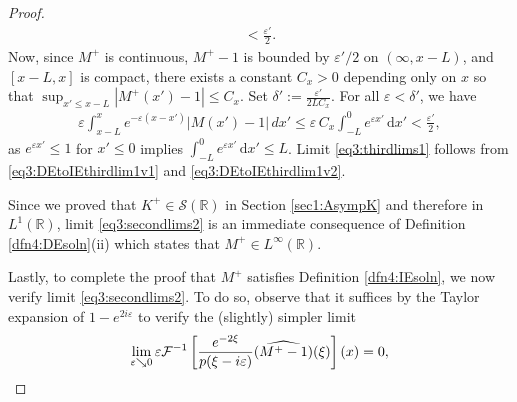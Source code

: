 \documentclass[../dissertation.tex]{subfiles}
\begin{document}
\begin{proof}
\begin{align}
			< \frac{\varepsilon'}{2}.
	\end{align}
	Now, since $M^+$ is continuous, $M^+-1$ is bounded by $\varepsilon'/2$ on $(\infty, x-L)$,
	and $[x-L, x]$ is compact, there exists a constant $C_x > 0$ depending only on $x$
	so that $\sup_{x'\leq x-L}|M^+(x')-1| \leq C_x$. 
	Set $\delta':= \frac{\varepsilon'}{2 L C_x}$.
	For all $\varepsilon < \delta'$, we have
	\begin{align} \label{eq3:DEtoIEthirdlim1v2}
		\varepsilon \int_{x-L}^{x} e^{-\varepsilon(x-x')} |M(x') - 1| \,dx'
			\leq \varepsilon \, C_x \int_{-L}^0 e^{\varepsilon x'} \, \mathrm{d}x'
			< \frac{\varepsilon'}{2},
	\end{align}
	as $e^{\varepsilon x'} \leq 1$ for $x' \leq 0$ implies 
	$\int_{-L}^0 e^{\varepsilon x'} \, \mathrm{d}x'\leq L$. Limit \eqref{eq3:thirdlims1} follows
	from \eqref{eq3:DEtoIEthirdlim1v1} and \eqref{eq3:DEtoIEthirdlim1v2}.

	Since we proved that $K^+\in \mathcal S(\mathbb R)$ in Section \ref{sec1:AsympK}
	and therefore in $L^1(\mathbb R)$, limit \eqref{eq3:secondlims2} is an 
	immediate consequence of Definition \ref{dfn4:DEsoln}(ii) which states
	that $M^+ \in L^\infty(\mathbb R)$.

	Lastly, to complete the proof that $M^+$ satisfies Definition \ref{dfn4:IEsoln}, 
	we now verify limit \eqref{eq3:secondlims2}. To do so, observe that 
	it suf{}fices by the Taylor expansion of $1-e^{2i\varepsilon}$ 
	to verify the (slightly) simpler limit
	\begin{align}\label{eq3:simpler}
	 	\lim_{\varepsilon \searrow 0} 
				\varepsilon \mathcal F^{-1}
					\left[ 
						\frac{e^{-2\xi}}{p(\xi-i\varepsilon)} (\widehat{M^+-1})(\xi) 
					\right](x)
			= 0,
	\end{align} 


\end{proof}
\end{document}
